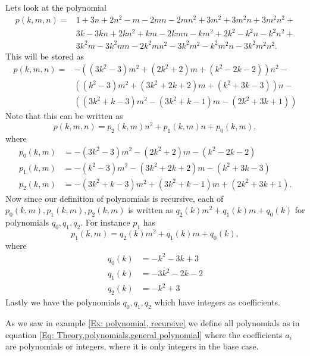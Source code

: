 \begin{example}\label{Ex: polynomial, recursive}
  Lets look at the polynomial
  \begin{equation*}
    \begin{split}
      p(k,m,n) = &1+3n+2n^2-m-2mn-2mn^2+3m^2+3m^2n+3m^2n^2+\\
      &3k-3kn+2kn^2+km-2kmn-km^2+2k^2-k^2n-k^2n^2+\\
      &3k^2m-3k^2mn-2k^2mn^2-3k^2m^2-k^2m^2n-3k^2m^2n^2.
    \end{split}
  \end{equation*}
  This will be stored as
  \begin{equation*}
    \begin{split}
      p(k,m,n) =  &-((3k^2-3)m^2+(2k^2+2)m+(k^2-2k-2))n^2-\\
                  &((k^2-3)m^2+(3k^2+2k+2)m+(k^2+3k-3))n-\\
                  &((3k^2+k-3)m^2-(3k^2+k-1)m-(2k^2+3k+1))
    \end{split}
  \end{equation*}
  Note that this can be written as
  \begin{equation*}
    p(k,m,n) = p_2(k,m)n^2+p_1(k,m)n+p_0(k,m),
  \end{equation*}
  where
  \begin{equation*}
    \begin{split}
      p_0(k,m) &= -(3k^2-3)m^2-(2k^2+2)m-(k^2-2k-2)\\
      p_1(k,m) &= -(k^2-3)m^2-(3k^2+2k+2)m-(k^2+3k-3)\\
      p_2(k,m) &= -(3k^2+k-3)m^2+(3k^2+k-1)m+(2k^2+3k+1).
    \end{split}
  \end{equation*}
  Now since our definition of polynomials is recursive, each of $p_0(k,m),p_1(k,m),p_2(k,m)$ is written as $q_2(k)m^2+q_1(k)m+q_0(k)$ for polynomials $q_0,q_1,q_2$. For instance $p_1$ has
  \begin{equation*}
    p_1(k,m) = q_2(k)m^2+q_1(k)m+q_0(k),
  \end{equation*}
  where
  \begin{equation*}
    \begin{split}
      q_0(k) & = -k^2-3k+3 \\
      q_1(k) & = -3k^2-2k-2 \\
      q_2(k) & = -k^2+3
    \end{split}
  \end{equation*}
  Lastly we have the polynomials $q_0,q_1,q_2$ which have integers as coefficients.
\end{example}
As we saw in example \ref{Ex: polynomial, recursive} we define all polynomials as in equation \eqref{Eq: Theory,polynomials,general polynomial} where the coefficients $a_i$ are polynomials or integers, where it is only integers in the base case.

